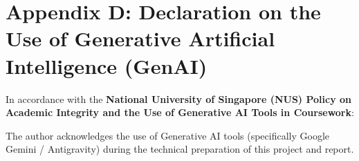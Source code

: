 \documentclass{article}
\begin{document}
\section*{Appendix D: Declaration on the Use of Generative Artificial Intelligence (GenAI)}
In accordance with the \textbf{National University of Singapore (NUS) Policy on Academic Integrity and the Use of Generative AI Tools in Coursework}:

The author acknowledges the use of Generative AI tools (specifically Google Gemini / Antigravity) during the technical preparation of this project and report.
\end{document}
